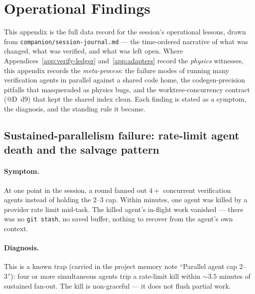 \section{Operational Findings}
\label{app:operational}

This appendix is the full data record for the session's operational
lessons, drawn from \texttt{companion/\allowbreak session-journal.md} ---
the time-ordered narrative of what was changed, what was verified, and
what was left open. Where Appendices~\ref{app:verify-ledger}
and~\ref{app:adapters} record the \emph{physics} witnesses, this
appendix records the \emph{meta-process}: the failure modes of running
many verification agents in parallel against a shared code home, the
codegen-precision pitfalls that masqueraded as physics bugs, and the
worktree-concurrency contract (@D~d9) that kept the shared index clean.
Each finding is stated as a symptom, the diagnosis, and the standing
rule it became.

\subsection{Sustained-parallelism failure: rate-limit agent death and the salvage pattern}
\label{app:operational:ratelimit}

\paragraph{Symptom.}
At one point in the session, a round fanned out $4{+}$ concurrent
verification agents instead of holding the $2$--$3$ cap. Within minutes,
one agent was killed by a provider rate limit mid-task. The killed
agent's in-flight work vanished --- there was no \texttt{git stash}, no
saved buffer, nothing to recover from the agent's own context.

\paragraph{Diagnosis.}
This is a known trap (carried in the project memory note ``Parallel
agent cap 2--3''): four or more simultaneous agents trip a rate-limit
kill within $\sim3.5$ minutes of sustained fan-out. The kill is
non-graceful --- it does not flush partial work.


